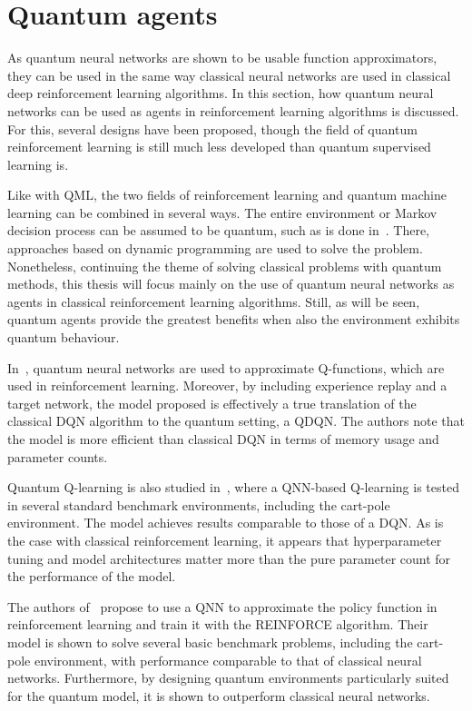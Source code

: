 \section{Quantum agents}
\label{sec:quantum_agents}

As quantum neural networks are shown to be usable function approximators, they can be used in the same way classical neural networks are used in classical deep reinforcement learning algorithms.
In this section, how quantum neural networks can be used as agents in reinforcement learning algorithms is discussed.
For this, several designs have been proposed, though the field of quantum reinforcement learning is still much less developed than quantum supervised learning is.

Like with QML, the two fields of reinforcement learning and quantum machine learning can be combined in several ways.
The entire environment or Markov decision process can be assumed to be quantum, such as is done in~\autocite{ying2021}.
There, approaches based on dynamic programming are used to solve the problem.
Nonetheless, continuing the theme of solving classical problems with quantum methods, this thesis will focus mainly on the use of quantum neural networks as agents in classical reinforcement learning algorithms.
Still, as will be seen, quantum agents provide the greatest benefits when also the environment exhibits quantum behaviour.

In~\autocite{chen2020}, quantum neural networks are used to approximate Q-functions, which are used in reinforcement learning.
Moreover, by including experience replay and a target network, the model proposed is effectively a true translation of the classical DQN algorithm to the quantum setting, a QDQN.
The authors note that the model is more efficient than classical DQN in terms of memory usage and parameter counts.

Quantum Q-learning is also studied in~\autocite{skolik2022}, where a QNN-based Q-learning is tested in several standard benchmark environments, including the cart-pole environment.
The model achieves results comparable to those of a DQN.
As is the case with classical reinforcement learning, it appears that hyperparameter tuning and model architectures matter more than the pure parameter count for the performance of the model.

The authors of~\autocite{jerbi2021} propose to use a QNN to approximate the policy function in reinforcement learning and train it with the REINFORCE algorithm.
Their model is shown to solve several basic benchmark problems, including the cart-pole environment, with performance comparable to that of classical neural networks.
Furthermore, by designing quantum environments particularly suited for the quantum model, it is shown to outperform classical neural networks.

